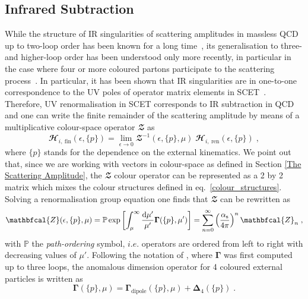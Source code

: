 \subsection{Infrared Subtraction}
While the structure of IR singularities of scattering
amplitudes in massless QCD up to two-loop order has been known for a
long time~\cite{Catani:1998bh}, its generalisation to three- and
higher-loop order has been understood only more recently, in
particular in the case where four or more coloured partons participate
to the scattering
process~\cite{Becher:2009cu,Becher:2009qa,Almelid:2015jia}.  In
particular, it has been shown that IR singularities are in one-to-one
correspondence to the UV poles of operator matrix elements in
SCET~\cite{Becher:2009cu,Becher:2009qa}.  Therefore, UV
renormalisation in SCET corresponds to IR subtraction in QCD and one
can write the finite remainder of the scattering amplitude by means of
a multiplicative colour-space operator $\mathbfcal{Z}$
as
\begin{equation}\label{Zeta_H}
\mathbfcal{H}_{i,\:\text{fin}} (\epsilon,\{p\})= \lim_{\epsilon \rightarrow 0} \mathbfcal{Z}^{-1}(\epsilon,\{p\},\mu) \; \mathbfcal{H}_{i,\:\text{ren}}(\epsilon,\{p\}) \; ,
\end{equation}
where $\{p\}$  stands for the dependence on the external kinematics. 
We point out that,  since we are working with vectors in colour-space as defined in Section \ref{The Scattering Amplitude}, the $\mathbfcal{Z}$ colour operator can be represented as a 2 by 2 matrix which mixes the colour structures defined in eq.~\eqref{colour_structures}. 
Solving a renormalisation group equation one finds that $\mathbfcal{Z}$ can be rewritten as 
\begin{equation}\label{exponentiation}
\mathbfcal{Z} (\epsilon,\{p\},\mu) = \mathbb{P} \exp \left[ \int_\mu^\infty \frac{\mathrm{d} \mu'}{\mu'}  \mathbf{\Gamma}(\{p\},\mu')\right] = \sum_{n=0}^{\infty} \left( \frac{\as}{4 \pi} \right)^n \mathbfcal{Z}_n \; ,
\end{equation}
with $\mathbb{P}$ the \textit{path-ordering} symbol, $i.e.$ operators are ordered from left to right with decreasing values of $\mu'$.
Following the notation of \cite{Almelid:2015jia}, where $\mathbf{\Gamma}$ was first computed up to three loops,  the anomalous dimension operator for 4 coloured external particles is written as 
\begin{equation}\label{anomalous_operator}
\mathbf{\Gamma}(\{p\},\mu) =  \mathbf{\Gamma}_{\text{dipole}}(\{p\},\mu)  + \mathbf{\Delta}_4 (\{p\}) \; .
\end{equation}

